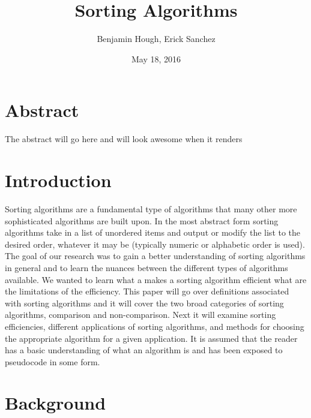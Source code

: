 \documentclass[12pt]{article}
\title{\bfseries Sorting Algorithms}
\author{Benjamin Hough, Erick Sanchez}
\date{May 18, 2016}
\begin{document}
	
	\maketitle
	
	\section*{Abstract}
	
	The abstract will go here and will look awesome when it renders
	
	\tableofcontents
	
	\pagebreak
	
	
	
	\section{Introduction} %
	
	 Sorting algorithms are a fundamental type of algorithms that many other more sophisticated algorithms are built upon.
	 In the most abstract form sorting algorithms take in a list of unordered items and output or modify the list to the desired order, whatever it may be (typically numeric or alphabetic order is used).
	 The goal of our research was to gain a better understanding of sorting algorithms in general  and to learn the nuances between the different types of algorithms available. 
	 We wanted to learn what a makes a sorting algorithm efficient what are the limitations of the efficiency. 
	 This paper will go over definitions associated with sorting algorithms and it will cover the two broad categories of sorting algorithms, comparison and non-comparison. 
	 Next it will examine sorting efficiencies, different applications of sorting algorithms, and methods for choosing the appropriate algorithm for a given application. 
	 It is assumed that the reader has a basic understanding of what an algorithm is and has been exposed to pseudocode in some form. 
	
	
	
	\section{Background} %
	
\end{document}
